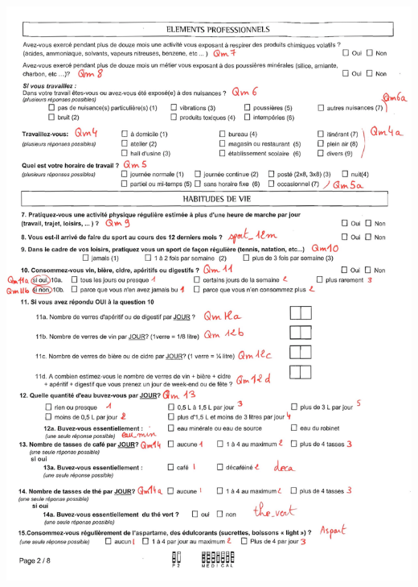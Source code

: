\documentclass{book}
\begin{document}
\includegraphics[scale=.28]{quest_ipc-2.png}
\newpage
\end{document}
